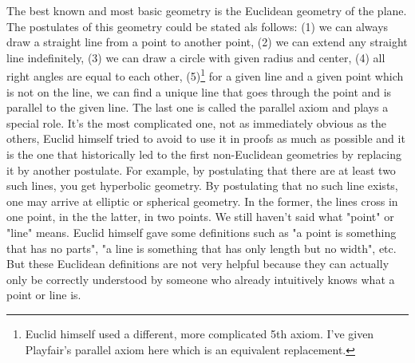 \medskip
The best known and most basic geometry is the Euclidean geometry of the plane. The postulates of this geometry could be stated als follows: (1) we can always draw a straight line from a point to another point, (2) we can extend any straight line indefinitely, (3) we can draw a circle with given radius and center, (4) all right angles are equal to each other, (5)\footnote{Euclid himself used a different, more complicated 5th axiom. I've given Playfair's parallel axiom here which is an equivalent replacement.} for a given line and a given point which is not on the line, we can find a unique line that goes through the point and is parallel to the given line. The last one is called the parallel axiom and plays a special role. It's the most complicated one, not as immediately obvious as the others, Euclid himself tried to avoid to use it in proofs as much as possible and it is the one that historically led to the first non-Euclidean geometries by replacing it by another postulate. For example, by postulating that there are at least two such lines, you get hyperbolic geometry. By postulating that no such line exists, one may arrive at elliptic or spherical geometry. In the former, the lines cross in one point, in the the latter, in two points. We still haven't said what "point" or "line" means. Euclid himself gave some definitions such as "a point is something that has no parts", "a line is something that has only length but no width", etc. But these Euclidean definitions are not very helpful because they can actually only be correctly understood by someone who already intuitively knows what a point or line is.




